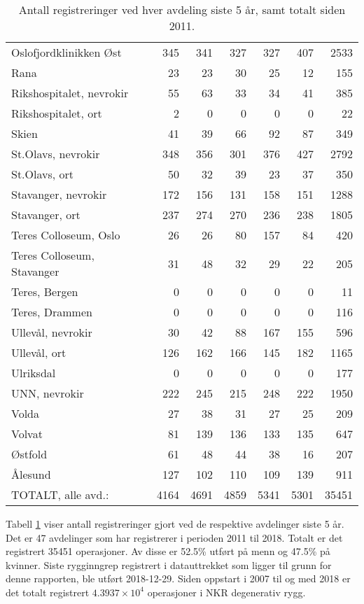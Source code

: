 \documentclass [norsk,a4paper,twoside]{article}\usepackage[]{graphicx}\usepackage[]{color}
\begin{document}
\begin{table}[ht]
\begin{tabular}{lrrrrrr}
  Oslofjordklinikken Øst & 345 & 341 & 327 & 327 & 407 & 2533 \\ 
  Rana & 23 & 23 & 30 & 25 & 12 & 155 \\ 
  Rikshospitalet, nevrokir & 55 & 63 & 33 & 34 & 41 & 385 \\ 
  Rikshospitalet, ort & 2 & 0 & 0 & 0 & 0 & 22 \\ 
  Skien & 41 & 39 & 66 & 92 & 87 & 349 \\ 
  St.Olavs, nevrokir & 348 & 356 & 301 & 376 & 427 & 2792 \\ 
  St.Olavs, ort & 50 & 32 & 39 & 23 & 37 & 350 \\ 
  Stavanger, nevrokir & 172 & 156 & 131 & 158 & 151 & 1288 \\ 
  Stavanger, ort & 237 & 274 & 270 & 236 & 238 & 1805 \\ 
  Teres Colloseum, Oslo & 26 & 26 & 80 & 157 & 84 & 420 \\ 
  Teres Colloseum, Stavanger & 31 & 48 & 32 & 29 & 22 & 205 \\ 
  Teres, Bergen & 0 & 0 & 0 & 0 & 0 & 11 \\ 
  Teres, Drammen & 0 & 0 & 0 & 0 & 0 & 116 \\ 
  Ullevål, nevrokir & 30 & 42 & 88 & 167 & 155 & 596 \\ 
  Ullevål, ort & 126 & 162 & 166 & 145 & 182 & 1165 \\ 
  Ulriksdal & 0 & 0 & 0 & 0 & 0 & 177 \\ 
  UNN, nevrokir & 222 & 245 & 215 & 248 & 222 & 1950 \\ 
  Volda & 27 & 38 & 31 & 27 & 25 & 209 \\ 
  Volvat & 81 & 139 & 136 & 133 & 135 & 647 \\ 
  Østfold & 61 & 48 & 44 & 38 & 16 & 207 \\ 
  Ålesund & 127 & 102 & 110 & 109 & 139 & 911 \\ 
  TOTALT, alle avd.: & 4164 & 4691 & 4859 & 5341 & 5301 & 35451 \\ 
   \hline
\end{tabular}
\caption{Antall registreringer ved hver avdeling siste 5 år, samt totalt siden 2011.} 
\label{tab:AntReg}
\end{table}


Tabell \ref{tab:AntReg} viser antall 
registreringer gjort ved de respektive avdelinger siste 5 år. Det er  
47 avdelinger som har registrerer i perioden 2011 til 2018. Totalt er det registrert 35451 
operasjoner. Av disse er 52.5\% utført på menn og 47.5\% på kvinner.
Siste rygginngrep registrert i datauttrekket som ligger til grunn for denne rapporten, ble utført 
2018-12-29. Siden oppstart i 2007 til og med 2018 er det totalt registrert \ensuremath{4.3937\times 10^{4}} operasjoner i NKR degenerativ rygg. 
\par
\end{document}
